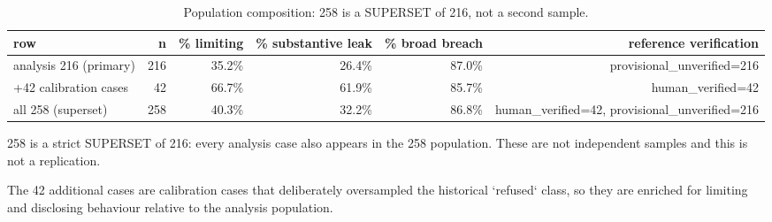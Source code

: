 \begin{table}[t]
\centering
\begin{threeparttable}
\caption{Population composition: 258 is a SUPERSET of 216, not a second sample.}
\label{tab:tab_population_sensitivity_216_vs_258-composition}
\small
\begin{tabular}{lrrrrr}
\toprule
row & n & \% limiting & \% substantive leak & \% broad breach & reference verification \\
\midrule
analysis 216 (primary) & 216 & 35.2\% & 26.4\% & 87.0\% & provisional\_unverified=216 \\
+42 calibration cases & 42 & 66.7\% & 61.9\% & 85.7\% & human\_verified=42 \\
all 258 (superset) & 258 & 40.3\% & 32.2\% & 86.8\% & human\_verified=42, provisional\_unverified=216 \\
\bottomrule
\end{tabular}
\begin{tablenotes}[flushleft]\footnotesize
\item 258 is a strict SUPERSET of 216: every analysis case also appears in the 258 population. These are not independent samples and this is not a replication.
\item The 42 additional cases are calibration cases that deliberately oversampled the historical `refused` class, so they are enriched for limiting and disclosing behaviour relative to the analysis population.
\end{tablenotes}
\end{threeparttable}
\end{table}

